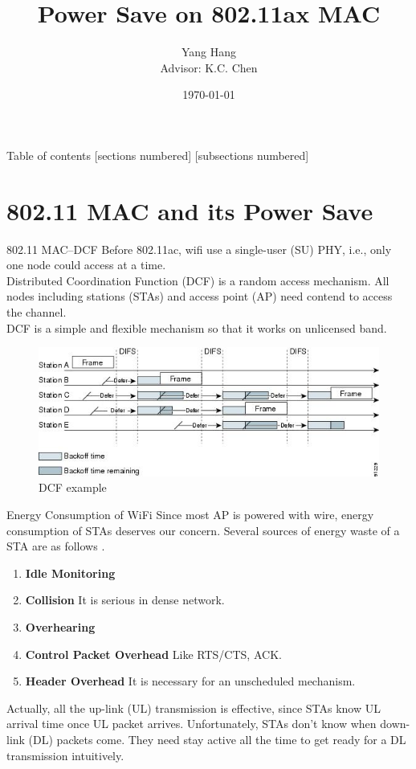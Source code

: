 \documentclass[10pt]{beamer}
\title{Power Save on 802.11ax MAC}
\date{\today}
\author{Yang Hang \\ Advisor: K.C. Chen}
\institute{Gratitude Institute of Communication Engineering }
\begin{document}
\maketitle
\begin{frame}{Table of contents}
	[sections numbered]
    [subsections numbered]
\setcounter{tocdepth}{5}
\setcounter{secnumdepth}{5} 
    \tableofcontents%
\end{frame}

\section{802.11 MAC and its Power Save}
\begin{frame}{802.11 MAC--DCF}
Before 802.11ac, wifi use a single-user \alert{(SU) PHY}, i.e., only one node could access at a time. \\
Distributed Coordination Function (DCF) is a random access mechanism. 
All nodes including stations (STAs) and access point (AP) need contend to access the channel. \\
DCF is a simple and flexible mechanism so that it works on unlicensed band. 
\begin{figure}
\includegraphics[scale=0.6]{./figure/DCF.jpg}
\caption{DCF example}
\end{figure}
\end{frame}

\begin{frame}{Energy Consumption of WiFi}
Since most AP is powered with wire, energy consumption of STAs deserves our concern.
Several sources of energy waste of a STA are as follows \cite{ye2002energy}.
\begin{enumerate}
\item \textbf{Idle Monitoring} 
\item \textbf{Collision} It is serious in dense network.
\item \textbf{Overhearing} 
\item \textbf{Control Packet Overhead} Like RTS/CTS, ACK.
\item \textbf{Header Overhead} It is necessary for an unscheduled mechanism.  
\end{enumerate}
Actually, all the up-link (UL) transmission is effective, since STAs know UL arrival time once UL packet arrives.
Unfortunately, STAs don't know when down-link (DL) packets come.
They need \alert{stay active all the time} to get ready for a DL transmission intuitively. 
\end{frame}
\end{document}

